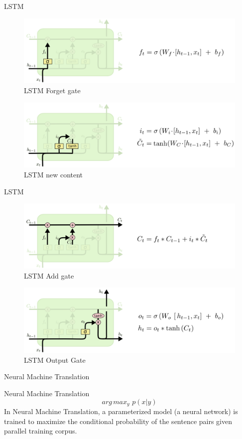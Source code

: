﻿\documentclass[aspectratio=43,mathserif,xcolor={usenames,dvipsnames,svgnames,table},10pt]{beamer}
\begin{document}
\begin{frame}{LSTM}
 \begin{figure}[h]
    \includegraphics[width=0.6\linewidth]{images/lstm_forget.png}  
    \caption{LSTM Forget gate}
  \end{figure}
   \begin{figure}[h]
    \includegraphics[width=0.6\linewidth]{images/lstm_add.png}  
    \caption{LSTM new content}
  \end{figure}
\end{frame}


\begin{frame}{LSTM}
 \begin{figure}[h]
    \includegraphics[width=0.6\linewidth]{images/lstm_add1.png}  
    \caption{LSTM Add gate}
  \end{figure}
   \begin{figure}[h]
    \includegraphics[width=0.6\linewidth]{images/lstm_output.png}  
    \caption{LSTM Output Gate}
  \end{figure}
\end{frame}


\begin{section}{Neural Machine Translation}
\end{section}

\begin{frame}{Neural Machine Translation}
 $$ arg\,max _{y}  \,\, p(x|y)$$
 In Neural Machine Translation, a parameterized model (a neural network) is trained to maximize the conditional probability of the sentence pairs given parallel training corpus.
\end{frame}
\end{document}
